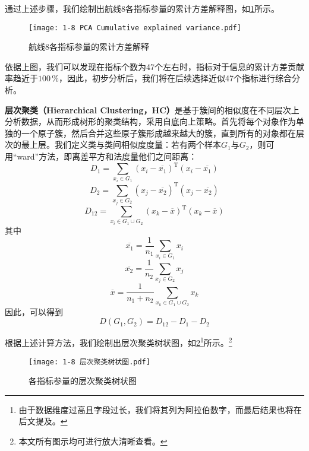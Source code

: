 \documentclass{MathorCupModeling}
\begin{document}
	通过上述步骤，我们绘制出航线8各指标参量的累计方差解释图，如\textcolor{blue}{\cref{fig:附件1-8累计方差解释}}所示。
	\begin{figure}[H]
		\centering
		\texttt{[image: 1-8 PCA Cumulative explained variance.pdf]}
		\caption{航线8各指标参量的累计方差解释}
		\label{fig:附件1-8累计方差解释}
	\end{figure}

	依据上图，我们可以发现在指标个数为47个左右时，指标对于信息的累计方差贡献率趋近于$100\,\%$，因此，初步分析后，我们将在后续选择近似47个指标进行综合分析。

	\textbf{层次聚类（Hierarchical Clustering，HC）}是基于簇间的相似度在不同层次上分析数据，从而形成树形的聚类结构，采用自底向上策略。首先将每个对象作为单独的一个原子簇，然后合并这些原子簇形成越来越大的簇，直到所有的对象都在层次的最上层。\textcolor{blue}{\cite{Paper:层次聚类}}我们定义类与类间相似度度量：若有两个样本$G_1$与$G_2$，则可用“ward”方法，即离差平方和法度量他们之间距离：
	\begin{equation}
		D_1=\sum_{x_i\in G_1}{\left( x_i-\overline{x_1} \right)}^{\text{T}}\left( x_i-\overline{x_1} \right) 
	\end{equation}
	\begin{equation}
		D_2=\sum_{x_j\in G_2}{\left( x_j-\overline{x_2} \right)}^{\text{T}}\left( x_j-\overline{x_2} \right)
	\end{equation}
	\begin{equation}
		D_{12}=\sum_{x_i\in G_1\cup G_2}{\left( x_k-\overline{x} \right)}^{\text{T}}\left( x_k-\overline{x} \right)
	\end{equation}
	其中
	\begin{equation}
		\overline{x_1}=\frac{1}{n_1}\sum_{x_i\in G_1}x_i
	\end{equation}
	\begin{equation}
		\overline{x_2}=\frac{1}{n_2}\sum_{x_j\in G_2}x_j
	\end{equation}
	\begin{equation}
		\overline{x}=\frac{1}{n_1+n_2}\sum_{x_k\in G_1\cup G_2}x_k
	\end{equation}
	因此，可以得到
	\begin{equation}
		D\left(G_1,G_2\right)=D_{12}-D_1-D_2
	\end{equation}

	根据上述计算方法，我们绘制出层次聚类树状图，如\textcolor{blue}{\cref{fig:1-8层次聚类}}\textcolor{blue}{\footnote{由于数据维度过高且字段过长，我们将其列为阿拉伯数字，而最后结果也将在后文提及。}}所示。\textcolor{blue}{\footnote{本文所有图示均可进行放大清晰查看。}}
	\begin{figure}[H]
		\centering
		\texttt{[image: 1-8 层次聚类树状图.pdf]}
		\caption{各指标参量的层次聚类树状图}
		\label{fig:1-8层次聚类}
	\end{figure}
\end{document}
